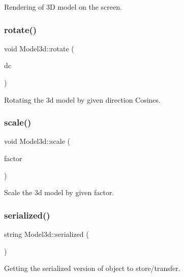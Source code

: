 Rendering of 3D model on the screen. 

\mbox{\label{class_model3d_afe2b497ef9666f0a8b96c8b2de97e7f7}} 
\subsubsection{\texorpdfstring{rotate()}{rotate()}}
{\footnotesize\ttfamily void Model3d\+::rotate (\begin{DoxyParamCaption}\item[{\mbox{\hyperlink{class_direction_cosines}{Direction\+Cosines}}}]{dc }\end{DoxyParamCaption})}



Rotating the 3d model by given direction Cosines. 

\mbox{\label{class_model3d_a719baa4f43208450d99eb755465e55fa}} 
\subsubsection{\texorpdfstring{scale()}{scale()}}
{\footnotesize\ttfamily void Model3d\+::scale (\begin{DoxyParamCaption}\item[{float}]{factor }\end{DoxyParamCaption})}



Scale the 3d model by given factor. 

\mbox{\label{class_model3d_a442e583f7f65ba5b4883cd29325c9710}} 
\subsubsection{\texorpdfstring{serialized()}{serialized()}}
{\footnotesize\ttfamily string Model3d\+::serialized (\begin{DoxyParamCaption}{ }\end{DoxyParamCaption})}



Getting the serialized version of object to store/transfer. 

\mbox{\label{class_model3d_a763ebbdb844e7c934f7dc6935934586a}} 
